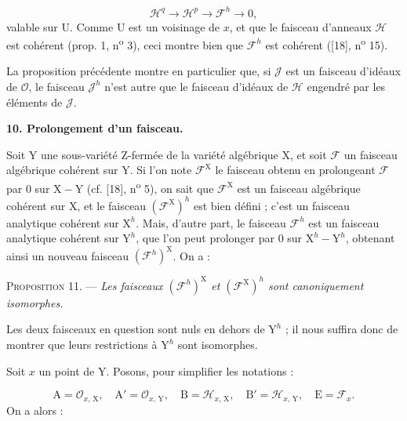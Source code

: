 \begin{equation*}
\mathcal{H}^q \to \mathcal{H}^p \to \mathcal{F}^h \to 0,
\end{equation*}
valable sur $\mathrm{U}$. Comme $\mathrm{U}$ est un voisinage de $x$, et que le faisceau d'anneaux $\mathcal{H}$ est cohérent (prop. 1, n\textsuperscript{o} 3), ceci montre bien que $\mathcal{F}^h$ est cohérent ([18], n\textsuperscript{o} 15).

La proposition précédente montre en particulier que, si $\mathcal{J}$ est un faisceau d'idéaux de $\mathcal{O}$, le faisceau $\mathcal{J}^h$ n'est autre que le faisceau d'idéaux de $\mathcal{H}$ engendré par les éléments de $\mathcal{J}$.


\textbf{10. Prolongement d'un faisceau.}

Soit $\mathrm{Y}$ une sous-variété Z-fermée de la variété algébrique $\mathrm{X}$, et soit $\mathcal{F}$ un faisceau algébrique cohérent sur $\mathrm{Y}$. Si l'on note $\mathcal{F}^\mathrm{X}$ le faisceau obtenu en prolongeant $\mathcal{F}$ par $0$ sur $\mathrm{X} - \mathrm{Y}$ (cf. [18], n\textsuperscript{o} 5), on sait que $\mathcal{F}^\mathrm{X}$ est un faisceau algébrique cohérent sur $\mathrm{X}$, et le faisceau $(\mathcal{F}^\mathrm{X})^h$ est bien défini ; c'est un faisceau analytique cohérent sur $\mathrm{X}^h$. Mais, d'autre part, le faisceau $\mathcal{F}^h$ est un faisceau analytique cohérent sur $\mathrm{Y}^h$, que l'on peut prolonger par $0$ sur $\mathrm{X}^h - \mathrm{Y}^h$, obtenant ainsi un nouveau faisceau $(\mathcal{F}^h)^\mathrm{X}$. On a :



\textsc{Proposition} 11. --- \emph{Les faisceaux $(\mathcal{F}^h)^\mathrm{X}$ et $(\mathcal{F}^\mathrm{X})^h$ sont canoniquement isomorphes.}

Les deux faisceaux en question sont nuls en dehors de $\mathrm{Y}^h$ ; il nous suffira donc de montrer que leurs restrictions à $\mathrm{Y}^h$ sont isomorphes.

Soit $x$ un point de $\mathrm{Y}$. Posons, pour simplifier les notations :

\begin{equation*}
\mathrm{A} = \mathcal{O}_{x,\,\mathrm{X}}, \quad \mathrm{A}' = \mathcal{O}_{x,\,\mathrm{Y}}, \quad \mathrm{B} = \mathcal{H}_{x,\,\mathrm{X}}, \quad \mathrm{B}' = \mathcal{H}_{x,\,\mathrm{Y}}, \quad \mathrm{E} = \mathcal{F}_x.
\end{equation*}
On a alors :


